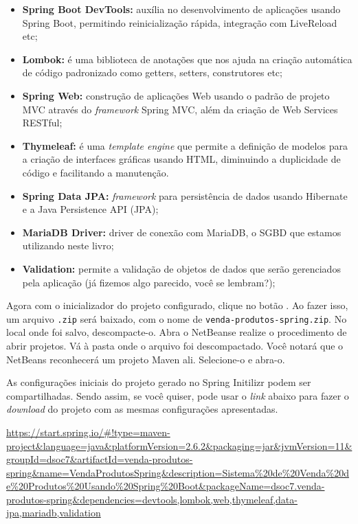 \begin{itemize}
    \item \textbf{Spring Boot DevTools:} auxília no desenvolvimento de aplicações usando Spring Boot, permitindo reinicialização rápida, integração com LiveReload etc;
    \item \textbf{Lombok:} é uma biblioteca de anotações que nos ajuda na criação automática de código padronizado como getters, setters, construtores etc;
    \item \textbf{Spring Web:} construção de aplicações Web usando o padrão de projeto MVC através do \textit{framework} Spring MVC, além da criação de Web Services RESTful;
    \item \textbf{Thymeleaf:} é uma \textit{template engine} que permite a definição de modelos para a criação de interfaces gráficas usando HTML, diminuindo a duplicidade de código e facilitando a manutenção.
    \item \textbf{Spring Data JPA:} \textit{framework} para persistência de dados usando Hibernate e a Java Persistence API (JPA);
    \item \textbf{MariaDB Driver:} driver de conexão com MariaDB, o SGBD que estamos utilizando neste livro;
    \item \textbf{Validation:} permite a validação de objetos de dados que serão gerenciados pela aplicação (já fizemos algo parecido, você se lembram?);
\end{itemize}

Agora com o inicializador do projeto configurado, clique no botão . Ao fazer isso, um arquivo \texttt{.zip} será baixado, com o nome de \texttt{venda-produtos-spring.zip}. No local onde foi salvo, descompacte-o. Abra o NetBeanse realize o procedimento de abrir projetos. Vá à pasta onde o arquivo foi descompactado. Você notará que o NetBeans reconhecerá um projeto Maven ali. Selecione-o e abra-o.

As configurações iniciais do projeto gerado no Spring Initilizr podem ser compartilhadas. Sendo assim, se você quiser, pode usar o \textit{link} abaixo para fazer o \textit{download} do projeto com as mesmas configurações apresentadas.

\url{https://start.spring.io/#!type=maven-project&language=java&platformVersion=2.6.2&packaging=jar&jvmVersion=11&groupId=dsoc7&artifactId=venda-produtos-spring&name=VendaProdutosSpring&description=Sistema%20de%20Venda%20de%20Produtos%20Usando%20Spring%20Boot&packageName=dsoc7.venda-produtos-spring&dependencies=devtools,lombok,web,thymeleaf,data-jpa,mariadb,validation}

